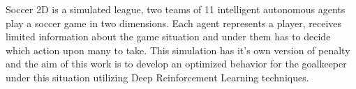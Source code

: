 Soccer 2D is a simulated league, two teams of 11 intelligent autonomous agents play a soccer game in two dimensions. Each agent represents a player, receives limited information about the game situation and under them has to decide which action upon many to take. This simulation has it's own version of penalty and the aim of this work is to develop  an optimized behavior for the goalkeeper under this situation utilizing Deep Reinforcement Learning techniques.

